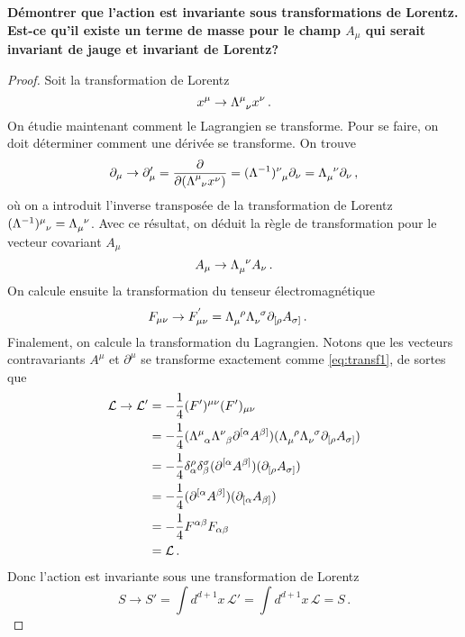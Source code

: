\documentclass{article}
\numberwithin{equation}{section}
\theoremstyle{solution}
\begin{document}
\subsection{}
\textbf{Démontrer que l’action est invariante sous transformations de Lorentz. Est-ce qu’il existe
un terme de masse pour le champ $A_{\mu}$ qui serait invariant de jauge et invariant de Lorentz?}
\vspace{2ex}
\begin{proof}
Soit la transformation de Lorentz
\begin{equation}\label{eq:transf1}
        x^{\mu} \rightarrow \Lambda\indices{^\mu_\nu} x^\nu \, .
\end{equation} 
On étudie maintenant comment le Lagrangien se transforme. Pour se faire, on doit déterminer comment une 
dérivée se transforme. On trouve
\begin{equation}
        \partial_\mu \rightarrow \partial_\mu' = \frac{\partial }{\partial (\Lambda\indices{^\mu_\nu} x^\nu)} = (\Lambda^{-1})\indices{^{\nu}_\mu}\partial_{\nu}= \Lambda\indices{_\mu^\nu}\partial_{\nu}\, ,
\end{equation} 
où on a introduit l'inverse transposée de la transformation de Lorentz $(\Lambda^{-1})\indices{^{\mu}_{\nu}} = \Lambda\indices{_\mu^{\nu}}$. Avec ce résultat, 
on déduit la règle de transformation pour le vecteur covariant $A_{\mu}$
\begin{equation}
        A_{\mu} \rightarrow  \Lambda\indices{_{\mu}^{\nu}}A_{\nu}\, .
\end{equation} 
On calcule ensuite la transformation du tenseur électromagnétique
\begin{align}
        F_{\mu\nu}\rightarrow F^{'}_{\mu\nu} &=\Lambda\indices{_{\mu}^{\rho}}\Lambda\indices{_{\nu}^{\sigma}}\partial_{[\rho} A_{\sigma]}\, .
\end{align}
Finalement, on calcule la transformation du Lagrangien. Notons que les vecteurs contravariants $A^{\mu}$ et $\partial^{\mu}$ se transforme 
exactement comme \eqref{eq:transf1}, de sortes que
\begin{align*}
        \mathcal{L} \rightarrow \mathcal{L}' &= -\frac{1}{4}(F')^{\mu\nu}(F')_{\mu\nu} \\
        &= -\frac{1}{4}(\Lambda\indices{^{\mu}_{\alpha}}\Lambda\indices{^{\nu}_{\beta}}\partial^{[\alpha}A^{\beta]})(\Lambda\indices{_{\mu}^{\rho}}\Lambda\indices{_{\nu}^{\sigma}}\partial_{[\rho} A_{\sigma]}) \\
        &= -\frac{1}{4}\delta_\alpha^{\rho}\delta_\beta^{\sigma}(\partial^{[\alpha}A^{\beta]})(\partial_{[\rho} A_{\sigma]}) \\
        &= -\frac{1}{4}(\partial^{[\alpha}A^{\beta]})(\partial_{[\alpha} A_{\beta]}) \\
        &= -\frac{1}{4}F^{\alpha\beta}F_{\alpha\beta} \\
        &= \mathcal{L}\, .
\end{align*}
Donc l'action est invariante sous une transformation de Lorentz
\begin{equation}
        S \rightarrow S' = \int d^{d+1}x\, \mathcal{L}' = \int d^{d+1}x\, \mathcal{L} = S\, .
\end{equation} 


\end{proof}
\end{document}
